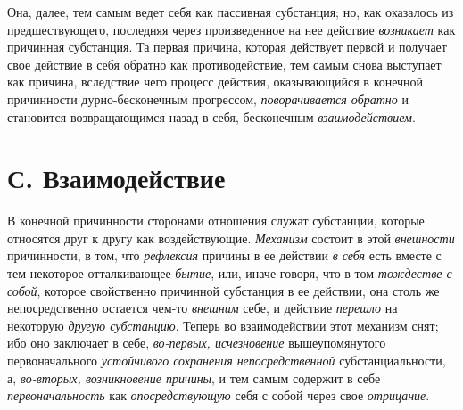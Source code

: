 Она, далее, тем самым ведет себя как пассивная субстанция; но, как оказалось
из предшествующего, последняя через произведенное на нее действие
{\em возникает} как причинная субстанция. Та первая
причина, которая действует первой и получает свое действие в себя обратно
как противодействие, тем самым снова выступает как причина, вследствие чего
процесс действия, оказывающийся в конечной причинности дурно-бесконечным
прогрессом, {\em поворачивается обратно} и становится
возвращающимся назад в себя, бесконечным {\em взаимодействием}.


\section[С. Взаимодействие]{С. Взаимодействие}

В конечной причинности сторонами отношения
служат субстанции, которые относятся друг к другу как воздействующие.
{\em Механизм} состоит в этой {\em внешности} причинности, в том, что
{\em рефлексия} причины в ее действии
{\em в себя} есть вместе с тем некоторое отталкивающее
{\em бытие}, или, иначе говоря, что в том
{\em тождестве с собой}, которое свойственно причинной
субстанция в ее действии, она столь же непосредственно остается чем-то
{\em внешним} себе, и действие {\em перешло} на некоторую
{\em другую субстанцию}. Теперь во взаимодействии этот
механизм снят; ибо оно заключает в себе, {\em во-первых, исчезновение}
вышеупомянутого первоначального {\em устойчивого
сохранения непосредственной} субстанциальности, а,
{\em во-вторых, возникновение причины}, и тем самым содержит в себе
{\em первоначальность} как {\em опосредствующую} себя с собой через свое
{\em отрицание}.


